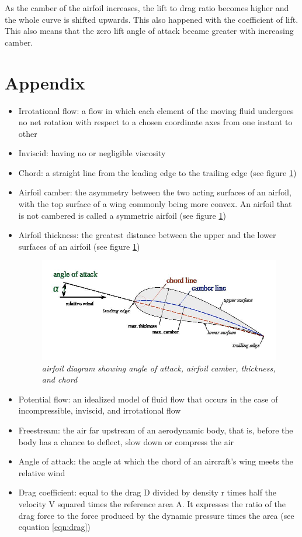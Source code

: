 \documentclass{journal}
\begin{document}
	As the camber of the airfoil increases, the lift to drag ratio becomes higher and the whole curve is shifted upwards. This also happened with the coefficient of lift. This also means that the zero lift angle of attack became greater with increasing camber. 
	
	\section*{Appendix}
	
	\begin{itemize}
		\item Irrotational flow: a flow in which each element of the moving fluid undergoes no net rotation with respect to a chosen coordinate axes from one instant to other
		\item Inviscid: having no or negligible viscosity
		\item Chord: a straight line from the leading edge to the trailing edge (see figure \ref{fig:airfoil-diagram})
		\item Airfoil camber: the asymmetry between the two acting surfaces of an airfoil, with the top surface of a wing commonly being more convex. An airfoil that is not cambered is called a symmetric airfoil (see figure \ref{fig:airfoil-diagram})
		\item Airfoil thickness: the greatest distance between the upper and the lower surfaces of an airfoil (see figure \ref{fig:airfoil-diagram})
		
		\begin{figure}
			\centering
			\includegraphics[scale=0.4]{../graphics/airfoil-diagram.jpg}
			\caption{\emph{airfoil diagram showing angle of attack, airfoil camber, thickness, and chord}}
			\label{fig:airfoil-diagram}
		\end{figure}
		
		\item Potential flow: an idealized model of fluid flow that occurs in the case of incompressible, inviscid, and irrotational flow
		\item Freestream: the air far upstream of an aerodynamic body, that is, before the body has a chance to deflect, slow down or compress the air
		\item Angle of attack: the angle at which the chord of an aircraft's wing meets the relative wind
		\item Drag coefficient: equal to the drag D divided by density r times half the velocity V squared times the reference area A. It expresses the ratio of the drag force to the force produced by the dynamic pressure times the area (see equation \ref{eqn:drag})
		

\end{itemize}
\end{document}

